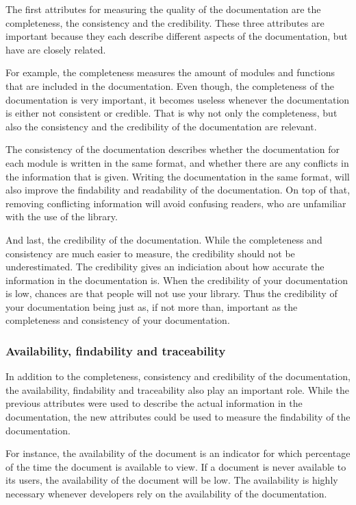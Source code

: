 \documentclass{article}
\begin{document}
    The first attributes for measuring the quality of the documentation are the completeness, the consistency and the credibility. These three attributes are
    important because they each describe different aspects of the documentation, but have are closely related.
    
    For example, the completeness measures the amount of modules and functions that are included in the documentation. Even though, the completeness of the
    documentation is very important, it becomes useless whenever the documentation is either not consistent or credible. That is why not only the completeness,
    but also the consistency and the credibility of the documentation are relevant.\cite{ding}

    The consistency of the documentation describes whether the documentation for each module is written in the same format,
    and whether there are any conflicts in the information that is given. Writing the documentation in the same format, will also improve
    the findability and readability of the documentation. On top of that, removing conflicting information will avoid confusing readers, who are unfamiliar
    with the use of the library.\cite{ding}

    And last, the credibility of the documentation. While the completeness and consistency are much easier to measure, the credibility should
    not be underestimated. The credibility gives an indiciation about how accurate the information in the documentation is. When the credibility
    of your documentation is low, chances are that people will not use your library. Thus the credibility of your documentation being just as, if
    not more than, important as the completeness and consistency of your documentation.\cite{voigt2}

    \subsubsection{Availability, findability and traceability}

    In addition to the completeness, consistency and credibility of the documentation, the availability, findability and traceability also play an important role.
    While the previous attributes were used to describe the actual information in the documentation, the new attributes could be used to measure the findability
    of the documentation.

    For instance, the availability of the document is an indicator for which percentage of the time the document is available to view. If a document is never
    available to its users, the availability of the document will be low. The availability is highly necessary whenever developers rely on the availability of
    the documentation.\cite{nguyen}
\end{document}

